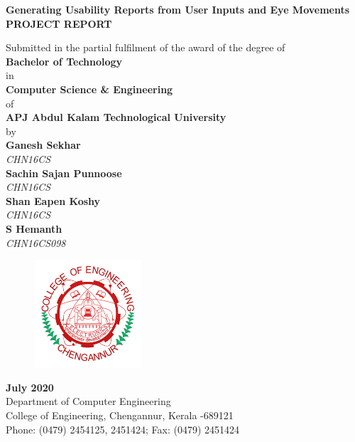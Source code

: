 \documentclass[a4paper,12pt,oneside]{article}
\begin{document}
\thispagestyle{empty}
\begin{center}

\large{\textbf{{Generating Usability Reports from User Inputs and Eye Movements}}}
\setlength{\baselineskip}{1.5\baselineskip}
\\
\vspace{5mm}
\textbf{PROJECT REPORT}

Submitted in the partial fulfilment of the award of the degree
of
\\
\textbf{Bachelor of Technology}
\\
in
\\
\textbf{Computer Science \& Engineering}
\\
of
\\
\textbf{APJ Abdul Kalam Technological University}
\\
by
\\
\textbf{Ganesh Sekhar}
\\
\vspace*{-5mm}
{\normalsize\textit{CHN16CS}}
\\
\textbf{Sachin Sajan Punnoose}
\\
\vspace*{-5mm}
{\normalsize\textit{CHN16CS}}
\\
\textbf{Shan Eapen Koshy}
\\
\vspace*{-5mm}
{\normalsize\textit{CHN16CS}}
\\
\textbf{S Hemanth}
\\
\vspace*{-5mm}
{\normalsize\textit{CHN16CS098}}
\\
\vspace{5mm}
\begin{figure}[H]
\centering
\includegraphics[width=4cm]{ceclogo.png}
\end{figure}
\textbf{July 2020}
\\
Department of Computer Engineering
\\
College of Engineering, Chengannur, Kerala -689121
\\
Phone: (0479) 2454125, 2451424; Fax: (0479) 2451424
\\
\end{center}
\end{document}
